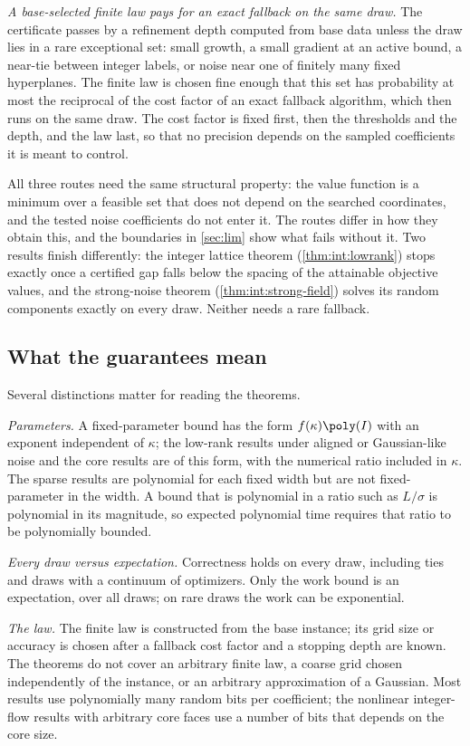 \emph{A base-selected finite law pays for an exact fallback on the same
draw.} The certificate passes by a refinement depth computed from base data
unless the draw lies in a rare exceptional set: small growth, a small
gradient at an active bound, a near-tie between integer labels, or noise
near one of finitely many fixed hyperplanes. The finite law is chosen fine
enough that this set has probability at most the reciprocal of the cost
factor of an exact fallback algorithm, which then runs on the same draw. The
cost factor is fixed first, then the thresholds and the depth, and the law
last, so that no precision depends on the sampled coefficients it is meant
to control.

All three routes need the same structural property: the value function is a
minimum over a feasible set that does not depend on the searched
coordinates, and the tested noise coefficients do not enter it. The routes
differ in how they obtain this, and the boundaries in \cref{sec:lim} show
what fails without it. Two
results finish differently: the integer lattice theorem
(\cref{thm:int:lowrank}) stops exactly once a certified gap falls below the
spacing of the attainable objective values, and the strong-noise theorem
(\cref{thm:int:strong-field}) solves its random components exactly on every
draw. Neither needs a rare fallback.

\subsection{What the guarantees mean}\label{sec:intro:meaning}

Several distinctions matter for reading the theorems.

\emph{Parameters.} A fixed-parameter bound has the form $f(\kappa)\poly(I)$
with an exponent independent of $\kappa$; the low-rank results under aligned
or Gaussian-like noise and the core results are of this form, with the
numerical ratio included in $\kappa$. The sparse results are polynomial for
each fixed width but are not fixed-parameter in the width. A bound that is
polynomial in a ratio such as $L/\sigma$ is polynomial in its magnitude, so
expected polynomial time requires that ratio to be polynomially bounded.

\emph{Every draw versus expectation.} Correctness holds on every draw,
including ties and draws with a continuum of optimizers. Only the work bound
is an expectation, over all draws; on rare draws the work can be exponential.

\emph{The law.} The finite law is constructed from the base instance; its
grid size or accuracy is chosen after a fallback cost factor and a stopping
depth are known. The theorems do not cover an arbitrary finite law, a coarse
grid chosen independently of the instance, or an arbitrary approximation of
a Gaussian. Most results use polynomially many random bits per coefficient;
the nonlinear integer-flow results with arbitrary core faces use a number of
bits that depends on the core size.

